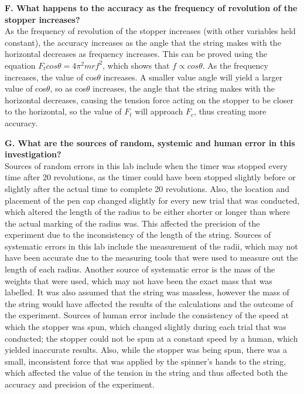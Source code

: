 \documentclass{article}[12pt]
\begin{document}
{\bf F. What happens to the accuracy as the frequency of revolution of the stopper increases?}\\ As the frequency of revolution of the stopper increases (with other variables held constant), the accuracy increases as the angle that the string makes with the horizontal decreases as frequency increases. This can be proved using the equation $F_tcos\theta = 4\pi^2mrf^2$, which shows that $f \propto cos\theta$. As the frequency increases, the value of cos$\theta$ increases. A smaller value angle will yield a larger value of cos$\theta$, so as cos$\theta$ increases, the angle that the string makes with the horizontal decreases, causing the tension force acting on the stopper to be closer to the horizontal, so the value of $F_t$ will approach $F_c$, thus creating more accuracy. 

{\bf G. What are the sources of random, systemic and human error in this investigation?}\\ Sources of random errors in this lab include when the timer was stopped every time after 20 revolutions, as the timer could have been stopped slightly before or slightly after the actual time to complete 20 revolutions. Also, the location and placement of the pen cap changed slightly for every new trial that was conducted, which altered the length of the radius to be either shorter or longer than where the actual marking of the radius was. This affected the precision of the experiment due to the inconsistency of the length of the string.
Sources of systematic errors in this lab include the measurement of the radii, which may not have been accurate due to the measuring tools that were used to measure out the length of each radius. Another source of systematic error is the mass of the weights that were used, which may not have been the exact mass that was labelled. It was also assumed that the string was massless, however the mass of the string would have affected the results of the calculations and the outcome of the experiment. 
Sources of human error include the consistency of the speed at which the stopper was spun, which changed slightly during each trial that was conducted; the stopper could not be spun at a constant speed by a human, which yielded inaccurate results. Also, while the stopper was being spun, there was a small, inconsistent force that was applied by the spinner’s hands to the string, which affected the value of the tension in the string and thus affected both the accuracy and precision of the experiment. 
\end{document}
